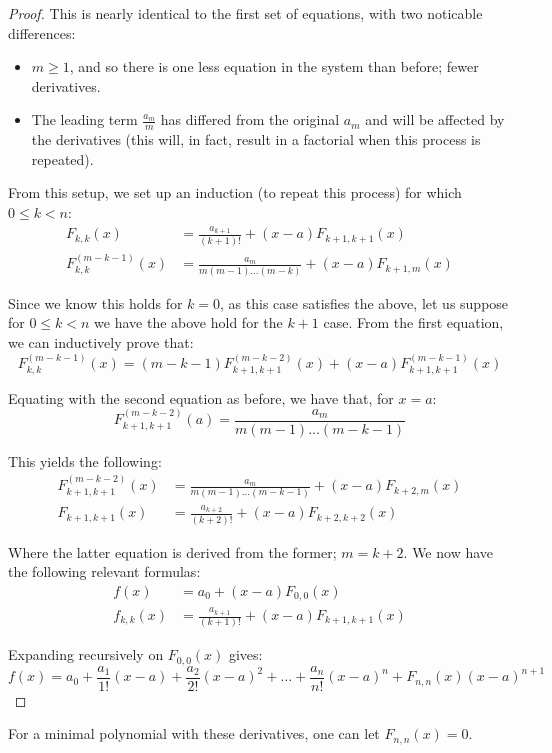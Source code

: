 \begin{theorem}
\begin{proof}
        This is nearly identical to the first set of equations, with two noticable differences:
        \begin{itemize}
            \item $m\geq 1$, and so there is one less equation in the system than before; fewer derivatives.
            \item The leading term $\frac{a_m}{m}$ has differed from the original $a_m$ and will be affected by the derivatives (this will, in fact, result in a factorial when this process is repeated).
        \end{itemize}

        From this setup, we set up an induction (to repeat this process) for which $0\leq k<n$:
        \begin{align*}
            F_{k,k}(x) &= \frac{a_{k+1}}{(k+1)!}+(x-a)F_{k+1,k+1}(x) \\
            F^{(m-k-1)}_{k,k}(x) &= \frac{a_m}{m(m-1)\dots(m-k)}+(x-a)F_{k+1,m}(x)
        \end{align*}

        Since we know this holds for $k=0$, as this case satisfies the above, let us suppose for $0\leq k<n$ we have the above hold for the $k+1$ case. From the first equation, we can inductively prove that:
        $$
            F^{(m-k-1)}_{k,k}(x)=(m-k-1)F^{(m-k-2)}_{k+1,k+1}(x)+(x-a)F^{(m-k-1)}_{k+1,k+1}(x)
        $$

        Equating with the second equation as before, we have that, for $x=a$:
        $$
            F^{(m-k-2)}_{k+1,k+1}(a) = \frac{a_m}{m(m-1)\dots(m-k-1)}
        $$

        This yields the following:
        \begin{align*}
            F^{(m-k-2)}_{k+1,k+1}(x) &= \frac{a_m}{m(m-1)\dots(m-k-1)}+(x-a)F_{k+2,m}(x) \\
            F_{k+1,k+1}(x) &= \frac{a_{k+2}}{(k+2)!}+(x-a)F_{k+2,k+2}(x)
        \end{align*}

        Where the latter equation is derived from the former; $m=k+2$. We now have the following relevant formulas:
        \begin{align*}
            f(x) &= a_0 + (x-a)F_{0,0}(x) \\
            f_{k,k}(x) &= \frac{a_{k+1}}{(k+1)!}+(x-a)F_{k+1,k+1}(x)
        \end{align*}

        Expanding recursively on $F_{0,0}(x)$ gives:
        $$
            f(x) = a_0 + \frac{a_1}{1!}(x-a)+\frac{a_2}{2!}(x-a)^2+\dots+\frac{a_n}{n!}(x-a)^n+F_{n,n}(x)(x-a)^{n+1}
        $$
    \end{proof}

    For a minimal polynomial with these derivatives, one can let $F_{n,n}(x)=0$.
\end{theorem}

